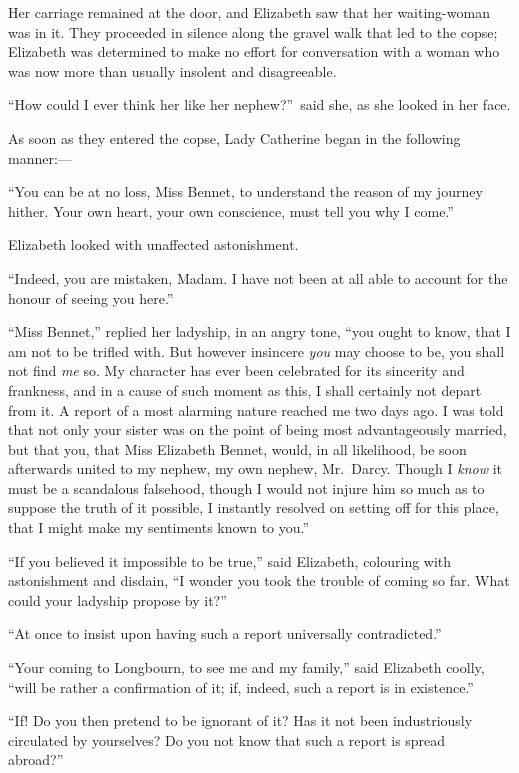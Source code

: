 \documentclass[12pt,english,oneside]{book}
\begin{document}
Her carriage remained at the door, and Elizabeth saw that her waiting-woman
was in it. They proceeded in silence along the gravel walk that led
to the copse; Elizabeth was determined to make no effort for conversation
with a woman who was now more than usually insolent and disagreeable.

{}``How could I ever think her like her nephew?''\ said she, as
she looked in her face.

As soon as they entered the copse, Lady Catherine began in the following
manner:\mbox{---}

{}``You can be at no loss, Miss Bennet, to understand the reason
of my journey hither. Your own heart, your own conscience, must tell
you why I come.''

Elizabeth looked with unaffected astonishment.

{}``Indeed, you are mistaken, Madam. I have not been at all able
to account for the honour of seeing you here.''

{}``Miss Bennet,'' replied her ladyship, in an angry tone, {}``you
ought to know, that I am not to be trifled with. But however insincere
\textit{you} may choose to be, you shall not find \textit{me} so.
My character has ever been celebrated for its sincerity and frankness,
and in a cause of such moment as this, I shall certainly not depart
from it. A report of a most alarming nature reached me two days ago.
I was told that not only your sister was on the point of being most
advantageously married, but that you, that Miss Elizabeth Bennet,
would, in all likelihood, be soon afterwards united to my nephew,
my own nephew, Mr.\ Darcy. Though I \textit{know} it must be a scandalous
falsehood, though I would not injure him so much as to suppose the
truth of it possible, I instantly resolved on setting off for this
place, that I might make my sentiments known to you.''

{}``If you believed it impossible to be true,'' said Elizabeth,
colouring with astonishment and disdain, {}``I wonder you took the
trouble of coming so far. What could your ladyship propose by it?''\ 

{}``At once to insist upon having such a report universally contradicted.''

{}``Your coming to Longbourn, to see me and my family,'' said Elizabeth
coolly, {}``will be rather a confirmation of it; if, indeed, such
a report is in existence.''

{}``If! Do you then pretend to be ignorant of it? Has it not been
industriously circulated by yourselves? Do you not know that such
a report is spread abroad?''\ 
\end{document}

